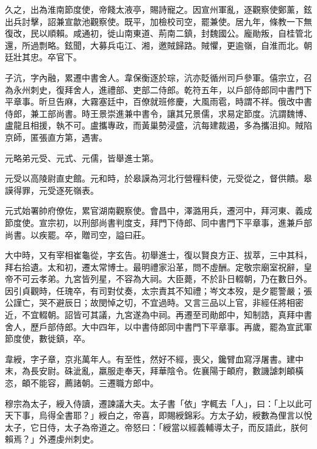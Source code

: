 \begin{pinyinscope}
 久之，出為淮南節度使，帝餞太液亭，賜詩寵之。因宣州軍亂，逐觀察使鄭薰，鉉出兵討擊，詔兼宣歙池觀察使。既平，加檢校司空，罷兼使。居九年，條教一下無復改，民以順賴。咸通初，徙山南東道、荊南二鎮，封魏國公。龐勛叛，自桂管北還，所過剽略。鉉聞，大募兵屯江、湘，邀賊歸路。賊懼，更逾嶺，自淮而北。朝廷壯其忠。卒官下。



 子沆，字內融，累遷中書舍人。韋保衡逐於琮，沆亦貶循州司戶參軍。僖宗立，召為永州刺史，復拜舍人，進禮部、吏部二侍郎。乾符五年，以戶部侍郎同中書門下平章事。昕旦告麻，大霧塞廷中，百僚就班修慶，大風雨雹，時謂不祥。俄改中書侍郎，兼工部尚書。時王景崇進兼中書令，讓其兄景儒，求易定節度。沆謂魏博、盧龍且相援，執不可。盧攜專政，而黃巢勢浸盛，沆每建裁遏，多為攜沮抑。賊陷京師，匿張直方第，遇害。



 元略弟元受、元式、元儒，皆舉進士第。



 元受以高陵尉直史館。元和時，於皋謨為河北行營糧料使，元受從之，督供饋。皋謨得罪，元受逐死嶺表。



 元式始署帥府僚佐，累官湖南觀察使。會昌中，澤潞用兵，遷河中，拜河東、義成節度使。宣宗初，以刑部尚書判度支，拜門下侍郎、同中書門下平章事，進兼戶部尚書。以疾罷。卒，贈司空，謚曰莊。



 大中時，又有宰相崔龜從，字玄告。初舉進士，復以賢良方正、拔萃，三中其科，拜右拾遺。太和初，遷太常博士。最明禮家沿革，問不虛酬。定敬宗廟室祝辭，皇帝不可云孝弟。九宮皆列星，不容為大祠。大臣薨，不於訃日輟朝，乃在數日外。因引貞觀時，任瑰卒，有司對仗奏，太宗責其不知禮；岑文本歿，是夕罷警嚴；張公謹亡，哭不避辰日；故閔悼之切，不宜過時。又言三品以上官，非經任將相密近，不宜輟朝。詔皆可其議，九宮遂為中祠。再遷至司勛郎中，知制誥，真拜中書舍人，歷戶部侍郎。大中四年，以中書侍郎同中書門下平章事。再歲，罷為宣武軍節度使，數徙鎮，卒。



 韋綬，字子章，京兆萬年人。有至性，然好不經，喪父，鑱臂血寫浮屠書。建中末，為長安尉。硃泚亂，羸服走奉天，拜華陰令。佐襄陽于頔府，數譏謔刺頔橫恣，頔不能容，薦諸朝。三遷職方郎中。



 穆宗為太子，綬入侍讀，遷諫議大夫。太子書「依」字輒去「人」，曰：「上以此可天下事，烏得全書耶？」綬白之，帝喜，即賜綬錦彩。方太子幼，綬數為俚言以悅太子，它日侍，太子為帝道之。帝怒曰：「綬當以經義輔導太子，而反語此，朕何賴焉？」外遷虔州刺史。




\end{pinyinscope}
